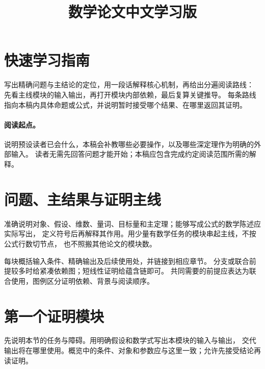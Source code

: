\documentclass[11pt]{article}
\title{数学论文中文学习版}
\author{}
\date{}
\theoremstyle{remark}
\begin{document}
\maketitle

\begin{center}
\end{center}

\tableofcontents

\section*{快速学习指南}

写出精确问题与主结论的定位，用一段话解释核心机制，再给出分遍阅读路线：
先看主线模块的输入输出，再打开模块内部依赖，最后复算关键推导。
每条路线指向本稿内具体命题或公式，并说明暂时接受哪个结果、在哪里返回其证明。

\paragraph{阅读起点。}
说明预设读者已会什么，本稿会补教哪些必要操作，以及哪些深定理作为明确的外部输入。
读者无需先回答问题才能开始；本稿应包含完成约定阅读范围所需的解释。

\section{问题、主结果与证明主线}

准确说明对象、假设、维数、量词、目标量和主定理；能够写成公式的数学陈述应实际写出，
定义符号后再解释其作用。用少量有数学任务的模块串起主线，不按公式行数切节点，
也不照搬其他论文的模块数。

每块概括输入条件、精确输出及后续使用处，并链接到相应章节。
分支或联合前提较多时给紧凑依赖图；短线性证明给蕴含链即可。
共同需要的前提应表达为联合使用，图例区分证明依赖、背景与阅读顺序。

\section{第一个证明模块}
\label{sec:first-module}

先说明本节的任务与障碍。用明确假设和数学式写出本模块的输入与输出，
交代输出将在哪里使用。概览中的条件、对象和参数应与这里一致；允许先接受结论再读证明。
\end{document}
